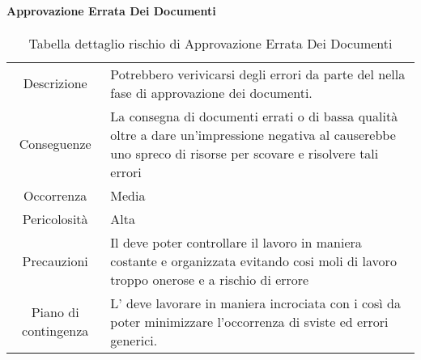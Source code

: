 \paragraph*{Approvazione Errata Dei Documenti}
\renewcommand{\arraystretch}{1}
    \begin{table}[H]
        \begin{center}
            \setlength{\aboverulesep}{0pt}
            \setlength{\belowrulesep}{0pt}
            \setlength{\extrarowheight}{.75ex}
            \begin{tabular}{ c p{10cm} }
                \rowcolor{AzzurroGruppo!30} 
                \toprule
                Descrizione & Potrebbero verivicarsi degli errori da parte del \RdP{} nella fase di approvazione dei documenti. \\
                Conseguenze & La consegna di documenti errati o di bassa qualità oltre a dare un'impressione negativa al \proponente{} causerebbe uno spreco di risorse per scovare e risolvere tali errori \\
                Occorrenza & Media \\
                Pericolosità & Alta \\
                Precauzioni & Il \RdP{} deve poter controllare il lavoro in maniera costante e organizzata evitando cosi moli di lavoro troppo onerose e a rischio di errore \\
                Piano di contingenza & L'\RdP{} deve lavorare in maniera incrociata con i \vers{} così da poter minimizzare l'occorrenza di sviste ed errori generici. \\
                \bottomrule
            \end{tabular}
            \caption{Tabella dettaglio rischio di Approvazione Errata Dei Documenti}
        \end{center}
    \end{table}

